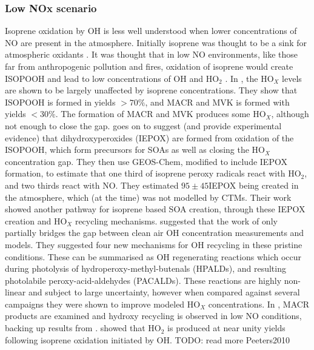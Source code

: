     \subsubsection{Low NOx scenario}
      Isoprene oxidation by OH is less well understood when lower concentrations of NO are present in the atmosphere.
      Initially isoprene was thought to be a sink for atmospheric oxidants \parencite[e.g.][]{Guenther2000}.
      It was thought that in low NO environments, like those far from anthropogenic pollution and fires, oxidation of isoprene would create ISOPOOH and lead to low concentrations of OH and HO$_2$ \textcite{Paulot2009b}.
      In \textcite{Paulot2009b}, the HO$_X$ levels are shown to be largely unaffected by isoprene concentrations.
      They show that ISOPOOH is formed in yields $> 70\%$, and MACR and MVK is formed with yields $< 30\%$.
      The formation of MACR and MVK produces some HO$_X$, although not enough to close the gap.
      \textcite{Paulot2009b} goes on to suggest (and provide experimental evidence) that dihydroxyperoxides (IEPOX) are formed from oxidation of the ISOPOOH, which form precursors for SOAs as well as closing the HO$_X$ concentration gap.
      They then use GEOS-Chem, modified to include IEPOX formation, to estimate that one third of isoprene peroxy radicals react with HO$_2$, and two thirds react with NO. 
      They estimated $95 \pm 45$\tgpyr IEPOX being created in the atmosphere, which (at the time) was not modelled by CTMs.
      Their work showed another pathway for isoprene based SOA creation, through these IEPOX creation and HO$_X$ recycling mechanisms.
      \textcite{Peeters2010} suggested that the work of \textcite{Paulot2009b} only partially bridges the gap between clean air OH concentration measurements and models.
      They suggested four new mechanisms for OH recycling in these pristine conditions.
      These can be summarised as OH regenerating reactions which occur during photolysis of hydroperoxy-methyl-butenals (HPALDs), and resulting photolabile peroxy-acid-aldehydes (PACALDs).
      These reactions are highly non-linear and subject to large uncertainty, however when compared against several campaigns they were shown to improve modeled HO$_X$ concentrations.
      In \textcite{Crounse2012}, MACR products are examined and hydroxy recycling is observed in low NO conditions, backing up results from \textcite{Peeters2010}.
      \textcite{Peeters2010} showed that HO$_2$ is produced at near unity yields following isoprene oxidation initiated by OH.
      TODO: read more Peeters2010
      

